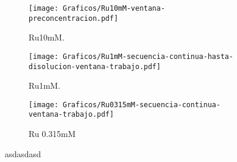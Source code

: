 			\begin{figure}[th]
	 	   	    \begin{subfigure}[t]{0.325\textwidth}
		        	\texttt{[image: Graficos/Ru10mM-ventana-preconcentracion.pdf]}
		       		\caption{Ru10mM.}
		         	\label{fig:Ventana_Ru10mM}
		     		\end{subfigure}
	     		\begin{subfigure}[t]{0.325\textwidth}
		        	\texttt{[image: Graficos/Ru1mM-secuencia-continua-hasta-disolucion-ventana-trabajo.pdf]}
		       		\caption{Ru1mM.}
		         	\label{fig:Ventana_Ru1mM}
		     		\end{subfigure}
	     		\begin{subfigure}[t]{0.325\textwidth}
		        	\texttt{[image: Graficos/Ru0315mM-secuencia-continua-ventana-trabajo.pdf]}
		       		\caption{Ru 0.315mM}
		         	\label{fig:Ru_0315mM}
		     		\end{subfigure}
	 	   	   	\caption[asdasdasd]{asdasdasd}
	     		\label{fig:ventana-trabajo}
	     	   	\end{figure}

  	

